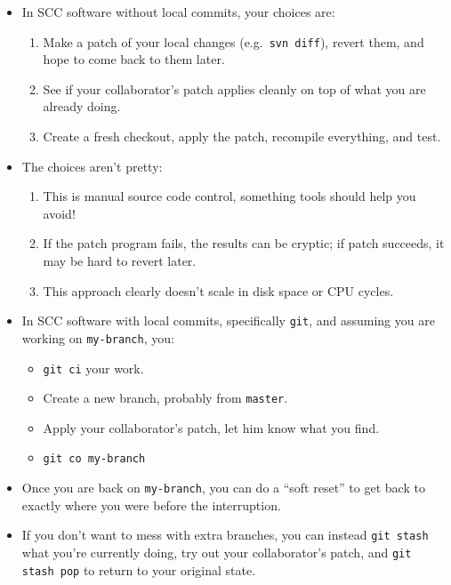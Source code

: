 \documentclass[mathserif]{beamer}
\begin{document}
\begin{frame}
  \begin{itemize}\itemsep=.05\textheight
  \item In SCC software without local commits, your choices are:
      \begin{enumerate}
      \item Make a patch of your local changes (e.g.\ \texttt{svn diff}), revert them, and hope to come back to them later.
      \item See if your collaborator's patch applies cleanly on top of what you are already doing.
      \item Create a fresh checkout, apply the patch, recompile everything, and test.
      \end{enumerate}
  \item The choices aren't pretty:
    \begin{enumerate}
    \item This is manual source code control, something tools should help you avoid!
    \item If the patch program fails, the results can be cryptic; if patch succeeds, it may be hard to revert later.
    \item This approach clearly doesn't scale in disk space or CPU cycles.
    \end{enumerate}
  \end{itemize}
\end{frame}


\begin{frame}
  \begin{itemize}\itemsep=.05\textheight
  \item In SCC software with local commits, specifically \texttt{git}, 
    and assuming you are working on \texttt{my-branch}, you:
      \begin{itemize}
      \item \texttt{git ci} your work.
      \item Create a new branch, probably from \texttt{master}.
      \item Apply your collaborator's patch, let him know what you find.
      \item \texttt{git co my-branch}
      \end{itemize}

    \item Once you are back on \texttt{my-branch}, you can do a ``soft reset'' to get back to exactly
      where you were before the interruption.


    \item If you don't want to mess with extra branches, you can instead \texttt{git stash} what you're currently
      doing, try out your collaborator's patch, and \texttt{git stash pop} to return to your original state.
  \end{itemize}
\end{frame}
\end{document}

